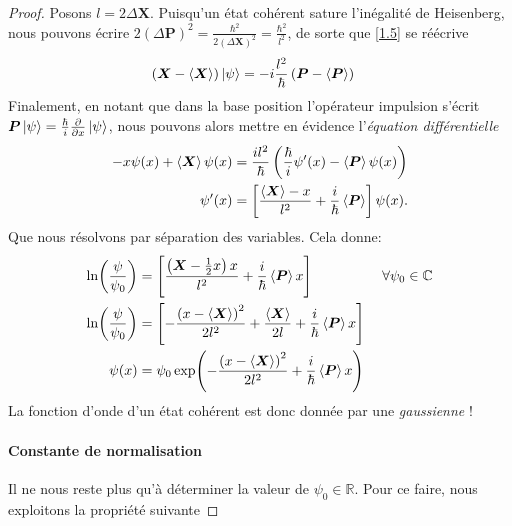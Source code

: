 \documentclass[11pt,oneside,a4paper]{article}
\newcommand{\h}{\ensuremath{\hbar}}
\begin{document}
\begin{proof}
Posons $l = 2\Delta \bm{X}$. Puisqu'un état cohérent sature l'inégalité de Heisenberg, nous pouvons écrire $2\left(\Delta\bm{P}\right)^2 = \frac{\h^2}{2\left(\Delta\bm{X}\right)^2} = \frac{\h^2}{l^2}$, de sorte que \eqref{1.5} se réécrive
\begin{align}
  \left(\bm{X}-\expval{\bm{X}}\right)\ket{\psi} &= -i\frac{l^2}{\h}\left(\bm{P}-\expval{\bm{P}}\right)\label{1.6}
\end{align}
Finalement, en notant que dans la base position l'opérateur impulsion s'écrit $\bm{P}\ket{\psi} = \frac{\h}{i}\frac{\partial}{\partial x}\ket{\psi}$, nous pouvons alors mettre en évidence l'\emph{équation différentielle}
\begin{align}
  -x\psi(x)+\expval{\bm{X}}\psi(x)&=\frac{il^2}{\h}\left(\frac{\h}{i}\psi'(x)-\expval{\bm{P}}\psi(x)\right)\notag\\
  \psi'(x) &= \left[\frac{\expval{\bm{X}}-x}{l^2}+\frac{i}{\h}\expval{\bm{P}}\right]\psi(x).\notag
\end{align}
Que nous résolvons par séparation des variables. Cela donne:
\begin{align}
  \ln(\frac{\psi}{\psi_0}) &= \left[\frac{\left(\bm{X}-\frac{1}{2}x\right)x}{l^2}+\frac{i}{\h}\expval{\bm{P}}x\right]   &\; \forall\psi_0\in\mathbb{C}\notag\\
  \ln(\frac{\psi}{\psi_0}) &= \left[-\frac{\left(x-\expval{\bm{X}}\right)^2}{2l^2}+\frac{\expval{\bm{X}}}{2l}+\frac{i}{\h}\expval{\bm{P}}x\right]\notag\\
  \psi(x) &= \psi_0\exp(-\frac{\left(x-\expval{\bm{X}}\right)^2}{2l^2}+\frac{i}{\h}\expval{\bm{P}}x)
\end{align}
La fonction d'onde d'un état cohérent est donc donnée par une \emph{gaussienne} !

\paragraph{Constante de normalisation}
Il ne nous reste plus qu'à déterminer la valeur de $\psi_0\in\mathbb{R}$. Pour ce faire, nous exploitons la propriété suivante


\end{proof}
\end{document}
